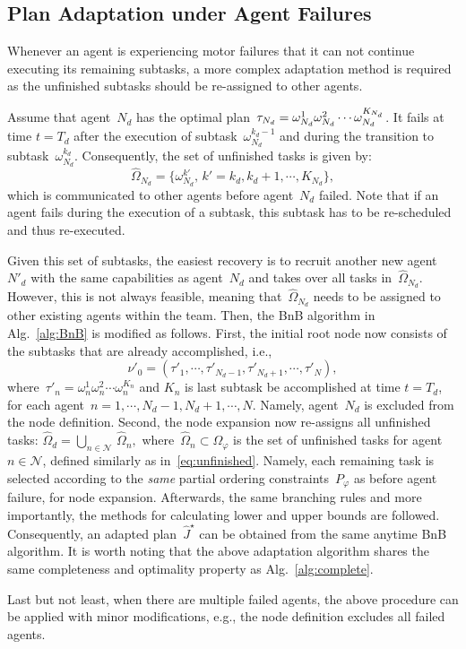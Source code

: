 \subsection{Plan Adaptation under Agent Failures}\label{subsubsec:failure}
Whenever an agent is experiencing motor failures that it can not
continue executing its remaining subtasks,
a more complex adaptation method is required as the unfinished subtasks
should be re-assigned to other agents.


Assume that agent~$N_d$ has the optimal
plan~$\tau_{N_d}=\omega^1_{N_d}\omega^2_{N_d}\\\cdots \omega^{K_{N_d}}_{N_d}$.
It fails at time $t=T_d$ after the execution of subtask~$\omega^{k_d-1}_{N_d}$ and during the
transition to subtask~$\omega^{k_d}_{N_d}$.
Consequently, the set of unfinished tasks is given by:
\begin{equation}\label{eq:unfinished}
\widehat{\Omega}_{N_d}=\{\omega^{k'}_{N_d},\,k'=k_d,k_d+1,\cdots,K_{N_d}\},
\end{equation}
which is communicated to other agents before agent~$N_d$ failed.
Note that if an agent fails during the execution of a subtask,
this subtask has to be re-scheduled and thus re-executed.



Given this set of subtasks, the easiest recovery is to recruit another new
agent~$N'_d$ with the same capabilities as agent~$N_d$ and
takes over all tasks in~$\widehat{\Omega}_{N_d}$.
However, this is not always feasible, meaning that~$\widehat{\Omega}_{N_d}$ needs to
be assigned to other existing agents within the team.
Then, the BnB algorithm in Alg.~\ref{alg:BnB} is modified as follows.
First, the initial root node now consists of the subtasks that are already
accomplished, i.e.,
\begin{equation}\label{eq:new-initial}
  \nu'_0=(\tau'_1,\cdots,\tau'_{N_d-1},\tau'_{N_d+1},\cdots,\tau'_{N}),
\end{equation}
where~$\tau'_n=\omega^1_n \omega^2_n\cdots \omega^{K_n}_n$ and $K_n$ is last
subtask be accomplished at time $t=T_d$,
for each agent~$n=1,\cdots,N_d-1,N_d+1,\cdots,N$.
Namely, agent~$N_d$ is excluded from the node definition.
Second, the node expansion now re-assigns all unfinished tasks:
$
  \widehat{\Omega}_d= \bigcup_{n\in \mathcal{N}}\,\widehat{\Omega}_n,
$
where~$\widehat{\Omega}_n\subset \Omega_{\varphi}$ is the set of unfinished tasks
for agent~$n\in \mathcal{N}$, defined similarly as in~\eqref{eq:unfinished}.
Namely, each remaining task is selected according to the \emph{same} partial
ordering constraints~$P_{\varphi}$ as before agent failure, for node expansion.
Afterwards, the same branching rules and more importantly,
the methods for calculating lower and upper bounds are followed.
Consequently, an adapted plan~$\widehat{J}^\star$ can be obtained
from the same anytime BnB algorithm.
It is worth noting that the above adaptation algorithm shares the same
completeness and optimality property as Alg.~\ref{alg:complete}.

Last but not least, when there are multiple failed agents, the above procedure
can be applied with minor modifications, e.g., the node definition excludes
all failed agents.
